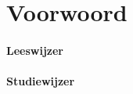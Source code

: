 

\chapter{Voorwoord}
\label{cha:voorwoord}


\subsubsection*{Leeswijzer}

\subsubsection*{Studiewijzer}


